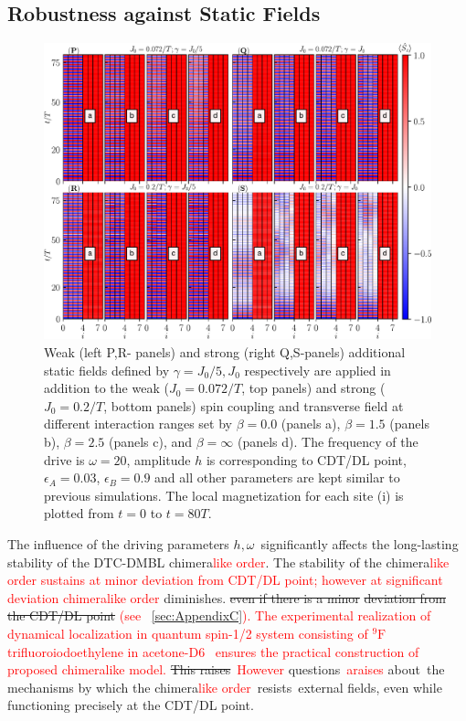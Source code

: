 \documentclass[12pt]{iopart}
\newcommand{\red}[1]{\textcolor{red}{#1}}
\begin{document}
\subsection{\label{sec:level44} Robustness against Static Fields}
\begin{figure}[h!]
	\begin{center}
		\includegraphics[width=13cm]{figure13.pdf}
	\end{center}
	\caption{Weak (left P,R- panels) and strong (right Q,S-panels) additional static fields defined by $\gamma = J_0/5, J_0$ respectively are applied in addition to the weak ($J_0=0.072/T$, top panels) and strong ($J_0=0.2/T$, bottom panels) spin coupling and transverse field at different interaction ranges set by $\beta = 0.0$ (panels a), $\beta= 1.5$ (panels b), $\beta=2.5$ (panels c), and $\beta= \infty$ (panels d). The frequency of the drive is $\omega = 20$, amplitude $h$ is corresponding to CDT/DL point, $\epsilon_A=0.03$, $\epsilon_B=0.9$ and all other parameters are kept similar to previous simulations.  The local magnetization for each site (i) is plotted from $t=0$ to $t=80 T$.}
	\label{Fig:robustness}
\end{figure}
The influence of the driving parameters $h, \omega$ significantly affects the long-lasting stability of the DTC-DMBL chimera\red{like order}. The stability of the chimera\red{like order sustains at minor deviation from CDT/DL point; however at significant deviation chimeralike order} diminishes. \sout{even if there is a minor} \sout{deviation from the CDT/DL point} \red{(see ~\ref{sec:AppendixC}). The experimental realization of dynamical localization in quantum spin-1/2 system consisting of $^9\mathrm{F}$ trifluoroiodoethylene in  acetone-D6~\cite{Hegde2014} ensures the practical construction of proposed chimeralike model.} \sout{This raises} \red{However} questions \red{araises} about the mechanisms by which the chimera\red{like order} resists external fields, even while functioning precisely at the CDT/DL point.
\end{document}
